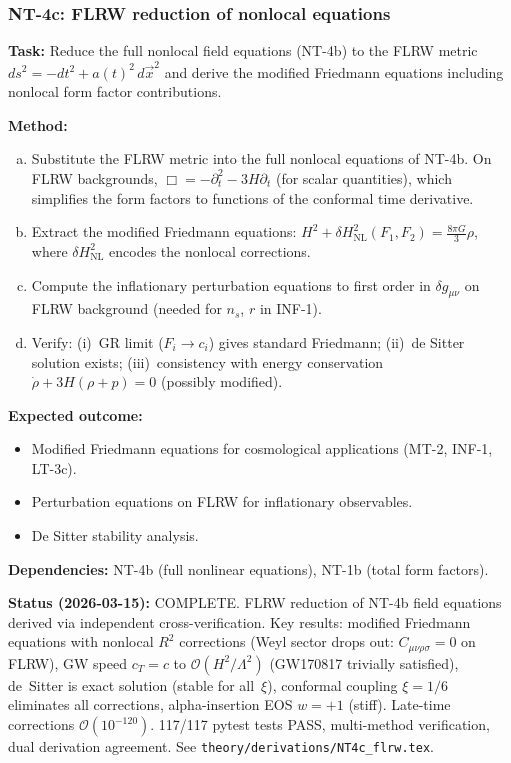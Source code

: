 \documentclass[12pt,a4paper]{article}
\newcommand{\task}[1]{\noindent\textbf{Task:} #1\par}
\newcommand{\method}[1]{\noindent\textbf{Method:} #1\par}
\newcommand{\outcome}[1]{\noindent\textbf{Expected outcome:} #1\par}
\newcommand{\deps}[1]{\noindent\textbf{Dependencies:} #1\par}
\begin{document}
\subsubsection{NT-4c: FLRW reduction of nonlocal equations}
\label{task:NT4c}

\task{Reduce the full nonlocal field equations (NT-4b) to the FLRW metric
$ds^2 = -dt^2 + a(t)^2\,d\vec{x}^2$ and derive the modified Friedmann
equations including nonlocal form factor contributions.}

\method{
\begin{enumerate}[(a)]
  \item Substitute the FLRW metric into the full nonlocal equations of NT-4b.
    On FLRW backgrounds, $\Box = -\partial_t^2 - 3H\partial_t$ (for scalar
    quantities), which simplifies the form factors to functions of the
    conformal time derivative.
  \item Extract the modified Friedmann equations:
    $H^2 + \delta H^2_{\text{NL}}(F_1, F_2) = \frac{8\pi G}{3}\rho$, where
    $\delta H^2_{\text{NL}}$ encodes the nonlocal corrections.
  \item Compute the inflationary perturbation equations to first order in
    $\delta g_{\mu\nu}$ on FLRW background (needed for $n_s$, $r$ in INF-1).
  \item Verify: (i)~GR limit ($F_i \to c_i$) gives standard Friedmann;
    (ii)~de Sitter solution exists; (iii)~consistency with energy conservation
    $\dot{\rho} + 3H(\rho + p) = 0$ (possibly modified).
\end{enumerate}
}

\outcome{
\begin{itemize}
  \item Modified Friedmann equations for cosmological applications (MT-2, INF-1, LT-3c).
  \item Perturbation equations on FLRW for inflationary observables.
  \item De Sitter stability analysis.
\end{itemize}
}

\deps{NT-4b (full nonlinear equations), NT-1b (total form factors).}

\textbf{Status (2026-03-15):} \textcolor{proven}{COMPLETE.}
FLRW reduction of NT-4b field equations derived via independent cross-verification.
Key results: modified Friedmann equations with nonlocal $R^2$ corrections
(Weyl sector drops out: $C_{\mu\nu\rho\sigma} = 0$ on FLRW), GW speed
$c_T = c$ to $\mathcal{O}(H^2/\Lambda^2)$ (GW170817 trivially satisfied),
de~Sitter is exact solution (stable for all~$\xi$), conformal coupling
$\xi = 1/6$ eliminates all corrections, alpha-insertion EOS $w = +1$ (stiff).
Late-time corrections $\mathcal{O}(10^{-120})$.
117/117 pytest tests PASS, multi-method verification, dual derivation agreement.
See \texttt{theory/derivations/NT4c\_flrw.tex}.
\end{document}
